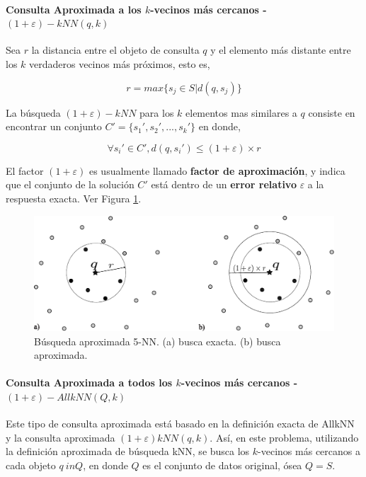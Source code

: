 \paragraph{Consulta Aproximada a los $k$-vecinos más cercanos  - $(1 + \varepsilon) - kNN(q, k)$}
Sea $r$ la distancia entre el objeto de consulta $q$ y el elemento más distante entre los $k$ verdaderos vecinos más próximos, esto es,

\begin{equation}
r = max\{ s_j \in S | d(q, s_j)\}
\end{equation}

La búsqueda $(1 + \varepsilon)-kNN$  para los $k$ elementos  mas similares a $q$ consiste en encontrar un conjunto $C' = \{s_1', s_2', ..., s_k'\}$ en donde,

\begin{equation}
\forall s_i' \in C', d(q, s_i') \leq (1 + \varepsilon) \times r
\end{equation}

El factor $(1 + \varepsilon)$  es usualmente llamado  \textbf{factor de aproximación}, y indica que el conjunto de la solución $C'$ está dentro de un \textbf{error relativo}  $\varepsilon$  a la respuesta exacta.  Ver Figura \ref{fig:nearbyKnnQuery}.
\begin{figure}[htp]
\centering
\includegraphics[width=0.85\columnwidth]{chapter2/nearby_knn_query.pdf}
\caption{Búsqueda aproximada 5-NN. (a) busca exacta. (b) busca aproximada.  }
\label{fig:nearbyKnnQuery}
\end{figure}


\paragraph{Consulta Aproximada a todos los $k$-vecinos más cercanos - $(1 + \varepsilon) - AllkNN(Q, k)$}

Este tipo de consulta aproximada está basado en la definición exacta de AllkNN y la consulta aproximada $(1 + \varepsilon)  kNN(q, k)$. Así, en este problema, utilizando la definición aproximada de búsqueda kNN, se busca los $k$-vecinos más cercanos a cada objeto $q \ in Q$, en donde $Q$ es el conjunto de datos original, ósea $Q = S$.


